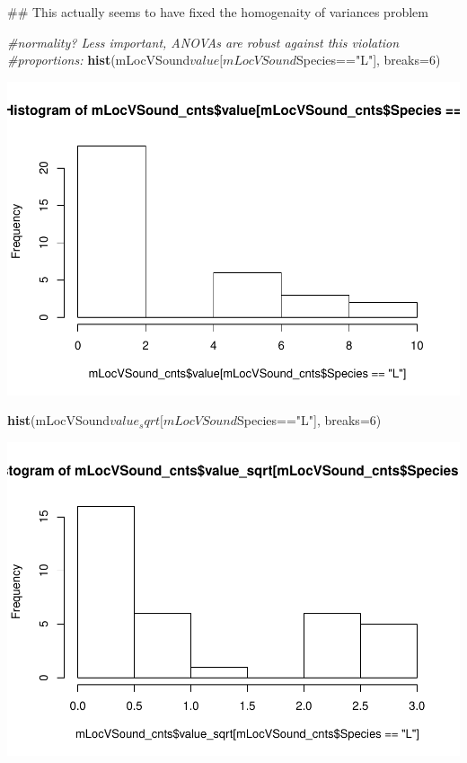 \documentclass[]{article}
\newenvironment{Shaded}{\begin{snugshade}}{\end{snugshade}}
\newcommand{\KeywordTok}[1]{\textcolor[rgb]{0.13,0.29,0.53}{\textbf{{#1}}}}
\newcommand{\DataTypeTok}[1]{\textcolor[rgb]{0.13,0.29,0.53}{{#1}}}
\newcommand{\DecValTok}[1]{\textcolor[rgb]{0.00,0.00,0.81}{{#1}}}
\newcommand{\StringTok}[1]{\textcolor[rgb]{0.31,0.60,0.02}{{#1}}}
\newcommand{\CommentTok}[1]{\textcolor[rgb]{0.56,0.35,0.01}{\textit{{#1}}}}
\newcommand{\NormalTok}[1]{{#1}}
\begin{document}
\begin{Shaded}
\begin{Highlighting}[]
\NormalTok{## This actually seems to have fixed the homogenaity of variances problem}

\CommentTok{#normality? Less important, ANOVAs are robust against this violation}
\CommentTok{#proportions: }
\KeywordTok{hist}\NormalTok{(mLocVSound$value[mLocVSound$Species==}\StringTok{"L"}\NormalTok{], }\DataTypeTok{breaks=}\DecValTok{6}\NormalTok{)}
\end{Highlighting}
\end{Shaded}

\includegraphics{Sensory_learning_files/figure-latex/unnamed-chunk-17-9.pdf}

\begin{Shaded}
\begin{Highlighting}[]
\KeywordTok{hist}\NormalTok{(mLocVSound$value_sqrt[mLocVSound$Species==}\StringTok{"L"}\NormalTok{], }\DataTypeTok{breaks=}\DecValTok{6}\NormalTok{)}
\end{Highlighting}
\end{Shaded}

\includegraphics{Sensory_learning_files/figure-latex/unnamed-chunk-17-10.pdf}
\end{document}
